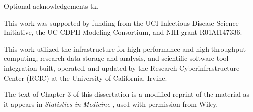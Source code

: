 \acknowledgments
{
  
  

Optional acknowledgements tk.

This work was supported by funding from the UCI Infectious Disease Science Initiative, the UC CDPH Modeling Consortium, and NIH grant R01AI147336.

This work utilized the infrastructure for high-performance and high-throughput computing, research data storage and analysis, and scientific software tool integration built, operated, and updated by the Research Cyberinfrastructure Center (RCIC) at the University of California, Irvine.

The text of Chapter 3 of this dissertation is a modified reprint of the material as it appears in \textit{Statistics in Medicine} \citep{Bayer2023Confidence}, used with permission from Wiley.


}
